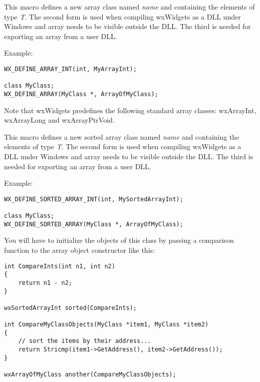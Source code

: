 This macro defines a new array class named {\it name} and containing the
elements of type {\it T}. The second form is used when compiling wxWidgets as
a DLL under Windows and array needs to be visible outside the DLL.  The third is
needed for exporting an array from a user DLL.

Example:

\begin{verbatim}
WX_DEFINE_ARRAY_INT(int, MyArrayInt);

class MyClass;
WX_DEFINE_ARRAY(MyClass *, ArrayOfMyClass);
\end{verbatim}

Note that wxWidgets predefines the following standard array classes: wxArrayInt,
wxArrayLong and wxArrayPtrVoid.

\label{wxdefinesortedarray}




This macro defines a new sorted array class named {\it name} and containing
the elements of type {\it T}. The second form is used when compiling wxWidgets as
a DLL under Windows and array needs to be visible outside the DLL.  The third is
needed for exporting an array from a user DLL.

Example:

\begin{verbatim}
WX_DEFINE_SORTED_ARRAY_INT(int, MySortedArrayInt);

class MyClass;
WX_DEFINE_SORTED_ARRAY(MyClass *, ArrayOfMyClass);
\end{verbatim}

You will have to initialize the objects of this class by passing a comparison
function to the array object constructor like this:

\begin{verbatim}
int CompareInts(int n1, int n2)
{
    return n1 - n2;
}

wxSortedArrayInt sorted(CompareInts);

int CompareMyClassObjects(MyClass *item1, MyClass *item2)
{
    // sort the items by their address...
    return Stricmp(item1->GetAddress(), item2->GetAddress());
}

wxArrayOfMyClass another(CompareMyClassObjects);
\end{verbatim}

